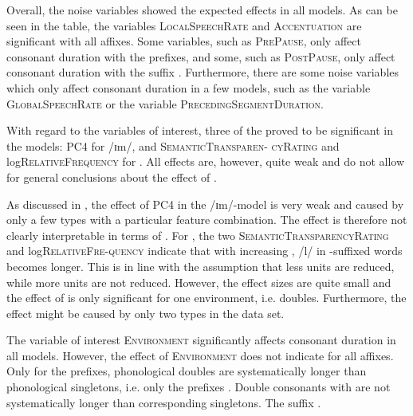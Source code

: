 Overall, the noise variables showed the expected effects in all models. As can be seen in the table, the variables \textsc{LocalSpeechRate} and \textsc{Accentuation} are significant with all affixes. 
Some variables, such as \textsc{PrePause}, only affect consonant duration with the prefixes, and some, such as \textsc{PostPause}, only affect consonant duration with the suffix .  
 Furthermore, there are some noise variables which only affect consonant duration in a few models, such as the variable \textsc{GlobalSpeechRate} or the variable \textsc{PrecedingSegmentDuration}. 

With regard to the variables of interest, three of the  proved to be significant in the models: \textsc{PC4} for /ɪm/, and \textsc{SemanticTransparen- cyRating} and log\textsc{RelativeFrequency} for . 
 All effects are, however, quite weak and do not allow for general conclusions about the effect of . 
 
 As discussed in , the effect of \textsc{PC4} in the /ɪm/-model is very weak and caused by only a few types with a particular feature combination. The effect is therefore not clearly interpretable in terms of . 
 For , the two  \textsc{SemanticTransparencyRating} and log\textsc{RelativeFre-quency} indicate that with increasing , /l/ in -suffixed words becomes longer. This is in line with the assumption that less  units are reduced, while more  units are not reduced. However, the effect sizes are quite small and the effect of  is only significant for one environment, i.e.  doubles. 
Furthermore, the effect might be caused by only two types in the data set.


%
The variable of interest \textsc{Environment} significantly affects consonant duration in all models. 
However, the effect of \textsc{Environment} does not indicate  for all affixes. Only for the prefixes, phonological doubles are systematically longer than phonological singletons, i.e. only the prefixes . Double consonants with  are not systematically longer than corresponding singletons. The suffix  .  


